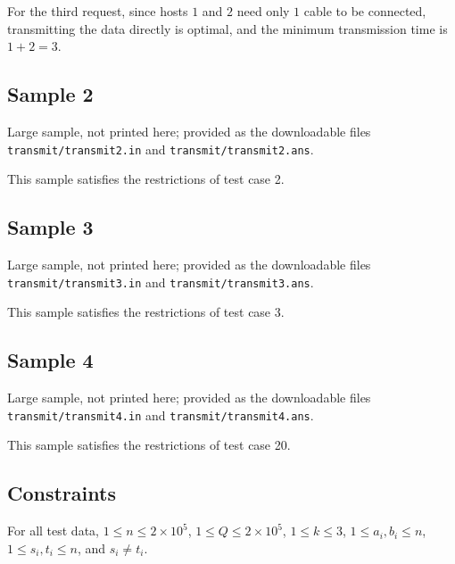 \documentclass[11pt]{article}
\begin{document}
For the third request, since hosts $1$ and $2$ need only $1$ cable to be
connected,
transmitting the data directly is optimal,
and the minimum transmission time is $1 + 2 = 3$.

\subsection*{Sample 2}

Large sample, not printed here;
provided as the downloadable files \texttt{transmit/transmit2.in} and \texttt{transmit/transmit2.ans}.

This sample satisfies the restrictions of test case 2.

\subsection*{Sample 3}

Large sample, not printed here;
provided as the downloadable files \texttt{transmit/transmit3.in} and \texttt{transmit/transmit3.ans}.

This sample satisfies the restrictions of test case 3.

\subsection*{Sample 4}

Large sample, not printed here;
provided as the downloadable files \texttt{transmit/transmit4.in} and \texttt{transmit/transmit4.ans}.

This sample satisfies the restrictions of test case 20.

\subsection*{Constraints}

For all test data,
$1 \le n \le 2 \times 10^5$,
$1 \le Q \le 2 \times 10^5$,
$1 \le k \le 3$,
$1 \le a_i, b_i \le n$,
$1 \le s_i, t_i \le n$,
and $s_i \ne t_i$.
\end{document}

